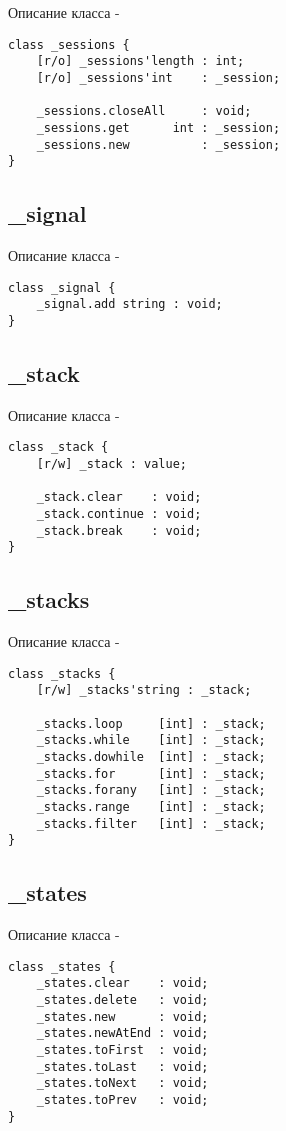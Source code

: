 \noindent Описание класса  -
\begin{lstlisting}[numbers=none]
class _sessions {
	[r/o] _sessions'length : int;
	[r/o] _sessions'int    : _session;
	
	_sessions.closeAll     : void;
	_sessions.get      int : _session;
	_sessions.new          : _session;
}
\end{lstlisting}

\subsection{{\color{orange} \_signal}}

\noindent Описание класса  -
\begin{lstlisting}[numbers=none]
class _signal {
	_signal.add string : void;
}
\end{lstlisting}

\subsection{{\color{orange} \_stack}}

\noindent Описание класса  -
\begin{lstlisting}[numbers=none]
class _stack {
	[r/w] _stack : value;
	
	_stack.clear    : void;
	_stack.continue : void;
	_stack.break    : void;
}
\end{lstlisting}

\subsection{{\color{orange} \_stacks}}

\noindent Описание класса  -
\begin{lstlisting}[numbers=none]
class _stacks {
	[r/w] _stacks'string : _stack;
	
	_stacks.loop     [int] : _stack;
	_stacks.while    [int] : _stack;
	_stacks.dowhile  [int] : _stack;
	_stacks.for      [int] : _stack;
	_stacks.forany   [int] : _stack;
	_stacks.range    [int] : _stack;
	_stacks.filter   [int] : _stack;
}
\end{lstlisting}

\subsection{{\color{orange} \_states}}

\noindent Описание класса  -
\begin{lstlisting}[numbers=none]
class _states {
	_states.clear    : void;
	_states.delete   : void;
	_states.new      : void;
	_states.newAtEnd : void;
	_states.toFirst  : void;
	_states.toLast   : void;
	_states.toNext   : void;
	_states.toPrev   : void;
}
\end{lstlisting}

